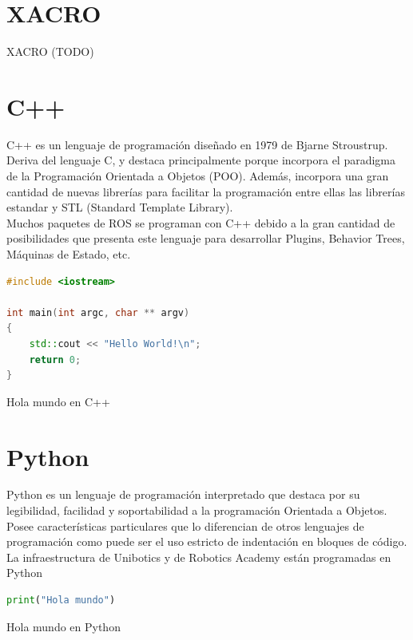 \section{XACRO}
\label{sec:xacro}

XACRO (TODO)

\section{C++}
\label{sec:c++}

C++ es un lenguaje de programación diseñado en 1979 de Bjarne Stroustrup. Deriva del lenguaje C, y destaca principalmente porque incorpora el paradigma de la Programación Orientada a Objetos (POO). Además, incorpora una gran cantidad de nuevas librerías para facilitar la programación entre ellas las librerías estandar y STL (Standard Template Library).\\

Muchos paquetes de ROS se programan con C++ debido a la gran cantidad de posibilidades que presenta este lenguaje para desarrollar Plugins, Behavior Trees, Máquinas de Estado, etc.\\

\begin{code}[H]
\begin{lstlisting}[language=C++]
#include <iostream>

int main(int argc, char ** argv)
{
	std::cout << "Hello World!\n";
	return 0;
}
\end{lstlisting}
\caption[Hola mundo en C++]{Hola mundo en C++}
\label{cod:holamundo_cplusplus}
\end{code}


\section{Python}
\label{sec:python}

Python es un lenguaje de programación interpretado que destaca por su legibilidad, facilidad y soportabilidad a la programación Orientada a Objetos. Posee características particulares que lo diferencian de otros lenguajes de programación como puede ser el uso estricto de indentación en bloques de código.\\

La infraestructura de Unibotics y de Robotics Academy están programadas en Python

\begin{code}[H]
\begin{lstlisting}[language=Python]
print("Hola mundo")
\end{lstlisting}
\caption[Hola mundo en Python]{Hola mundo en Python}
\label{cod:holamundo_python}
\end{code}

